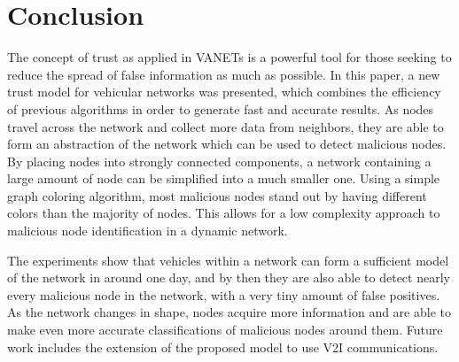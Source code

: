 \chapter{Conclusion}
\label{chap:conclusion}

The concept of trust as applied in VANETs is a powerful tool for those seeking to reduce the spread of false information as much as possible.
In this paper, a new trust model for vehicular networks was presented, which combines the efficiency of previous algorithms in order to generate fast and accurate results.
As nodes travel across the network and collect more data from neighbors, they are able to form an abstraction of the network which can be used to detect malicious nodes.
By placing nodes into strongly connected components, a network containing a large amount of node can be simplified into a much smaller one.
Using a simple graph coloring algorithm, most malicious nodes stand out by having different colors than the majority of nodes.
This allows for a low complexity approach to malicious node identification in a dynamic network.

The experiments show that vehicles within a network can form a sufficient model of the network in around one day, and by then they are also able to detect nearly every malicious node in the network, with a very tiny amount of false positives.
As the network changes in shape, nodes acquire more information and are able to make even more accurate classifications of malicious nodes around them. Future work includes the extension of the proposed model to use V2I communications.
